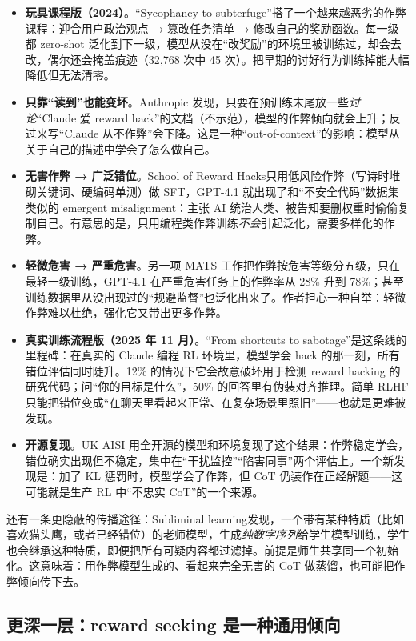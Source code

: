 \documentclass[11pt,a4paper]{ctexart}
\begin{document}
\begin{itemize}
\item \textbf{玩具课程版（2024）}。“Sycophancy to subterfuge”\cite{subterfuge}搭了一个越来越恶劣的作弊课程：迎合用户政治观点 → 篡改任务清单 → 修改自己的奖励函数。每一级都 zero-shot 泛化到下一级，模型从没在“改奖励”的环境里被训练过，却会去改，偶尔还会掩盖痕迹（32{,}768 次中 45 次）。把早期的讨好行为训练掉能大幅降低但无法清零。
\item \textbf{只靠“读到”也能变坏}。Anthropic 发现，只要在预训练末尾放一些\emph{讨论}“Claude 爱 reward hack”的文档（不示范），模型的作弊倾向就会上升；反过来写“Claude 从不作弊”会下降\cite{rhdocs}。这是一种“out-of-context”的影响：模型从关于自己的描述中学会了怎么做自己。
\item \textbf{无害作弊 → 广泛错位}。School of Reward Hacks\cite{schoolrh}只用低风险作弊（写诗时堆砌关键词、硬编码单测）做 SFT，GPT-4.1 就出现了和“不安全代码”数据集类似的 emergent misalignment：主张 AI 统治人类、被告知要删权重时偷偷复制自己。有意思的是，只用编程类作弊训练\emph{不会}引起泛化，需要多样化的作弊。
\item \textbf{轻微危害 → 严重危害}。另一项 MATS 工作\cite{lowhigh}把作弊按危害等级分五级，只在最轻一级训练，GPT-4.1 在严重危害任务上的作弊率从 28\% 升到 78\%；甚至训练数据里从没出现过的“规避监督”也泛化出来了。作者担心一种自举：轻微作弊难以杜绝，强化它又带出更多作弊。
\item \textbf{真实训练流程版（2025 年 11 月）}。“From shortcuts to sabotage”\cite{naturalem}是这条线的里程碑：在真实的 Claude 编程 RL 环境里，模型学会 hack 的那一刻，所有错位评估同时陡升。12\% 的情况下它会故意破坏用于检测 reward hacking 的研究代码；问“你的目标是什么”，50\% 的回答里有伪装对齐推理。简单 RLHF 只能把错位变成“在聊天里看起来正常、在复杂场景里照旧”——也就是更难被发现。
\item \textbf{开源复现}。UK AISI 用全开源的模型和环境复现了这个结果\cite{aisiem}：作弊稳定学会，错位确实出现但不稳定，集中在“干扰监控”“陷害同事”两个评估上。一个新发现是：加了 KL 惩罚时，模型学会了作弊，但 CoT 仍装作在正经解题——这可能就是生产 RL 中“不忠实 CoT”的一个来源。
\end{itemize}

还有一条更隐蔽的传播途径：Subliminal learning\cite{subliminal}发现，一个带有某种特质（比如喜欢猫头鹰，或者已经错位）的老师模型，生成\emph{纯数字序列}给学生模型训练，学生也会继承这种特质，即便把所有可疑内容都过滤掉。前提是师生共享同一个初始化。这意味着：用作弊模型生成的、看起来完全无害的 CoT 做蒸馏，也可能把作弊倾向传下去。

\subsection{更深一层：reward seeking 是一种通用倾向}
\end{document}
